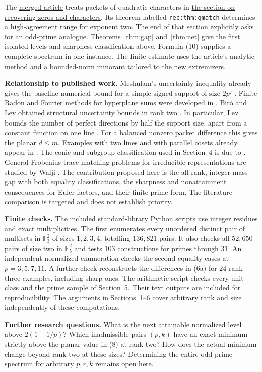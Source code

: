 \documentclass[11pt,letterpaper]{article}
\newcommand{\F}{\mathbb F}
\newcommand{\subhead}[1]{\par\smallskip\noindent\textbf{#1.}\enspace}
\newcommand{\gh}[2]{\href{https://github.com/VladimirReshetnikov/ProveIt/blob/c0f2782360ddffd79a20c6d828d582e214a2b8c3/Analysis/GeneralizedRiemannHypothesis/#1}{#2}}
\begin{document}
The \gh{Article/README.md}{merged article} treats packets of quadratic characters in \gh{Article/sections/rec.tex}{the section on recovering zeros and characters}. Its theorem labelled \texttt{rec:thm:qmatch} determines a high-agreement range for exponent two. The end of that section explicitly asks for an odd-prime analogue. Theorems~\ref{thm:gap} and~\ref{thm:net} give the first isolated levels and sharpness classification above. Formula (10) supplies a complete spectrum in one instance. The finite estimate uses the article's analytic method and a bounded-norm minorant tailored to the new extremizers.

\subhead{Relationship to published work}
Meshulam's uncertainty inequality already gives the baseline numerical bound for a simple signed support of size $2p^j$ \cite{Mesh}. Finite Radon and Fourier methods for hyperplane sums were developed in \cite{ILMP}. Bir\'o and Lev obtained structural uncertainty bounds in rank two \cite{BL}. In particular, Lev bounds the number of perfect directions by half the support size, apart from a constant function on one line \cite{Lev}. For a balanced nonzero packet difference this gives the planar $d\le m$. Examples with two lines and with parallel cosets already appear in \cite{BL}. The conic and subgroup classification used in Section~4 is due to \cite{BKM}. General Frobenius trace-matching problems for irreducible representations are studied by Walji \cite{Walji}. The contribution proposed here is the all-rank, integer-mass gap with both equality classifications, the sharpness and nonattainment consequences for Euler factors, and their finite-prime form. The literature comparison is targeted and does not establish priority.

\subhead{Finite checks}
The included standard-library Python scripts use integer residues and exact multiplicities. The first enumerates every unordered distinct pair of multisets in $\F_3^2$ of sizes $1,2,3,4$, totalling $136{,}821$ pairs. It also checks all $52{,}650$ pairs of size two in $\F_5^2$ and tests $103$ constructions for primes through $31$. An independent normalized enumeration checks the second equality cases at $p=3,5,7,11$. A further check reconstructs the differences in (6a) for $24$ rank-three examples, including sharp ones. The arithmetic script checks every unit class and the prime sample of Section~5. Their text outputs are included for reproducibility. The arguments in Sections~1--6 cover arbitrary rank and size independently of these computations.

\subhead{Further research questions}
What is the next attainable normalized level above $2(1-1/p)$? Which inadmissible pairs $(p,k)$ have an exact minimum strictly above the planar value in (8) at rank two? How does the actual minimum change beyond rank two at these sizes? Determining the entire odd-prime spectrum for arbitrary $p,r,k$ remains open here.
\end{document}
